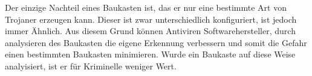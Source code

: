 Der einzige Nachteil eines Baukasten ist, das er nur eine bestimmte Art von Trojaner erzeugen kann. Dieser ist zwar unterschiedlich konfiguriert, ist jedoch immer Ähnlich. Aus diesem Grund können Antiviren Softwarehersteller, durch analysieren des Baukasten die eigene Erkennung verbessern und somit die Gefahr einen bestimmten Baukasten minimieren. Wurde ein Baukaste auf diese Weise analyisiert, ist er für Kriminelle weniger Wert.\cite{FOCUS}

